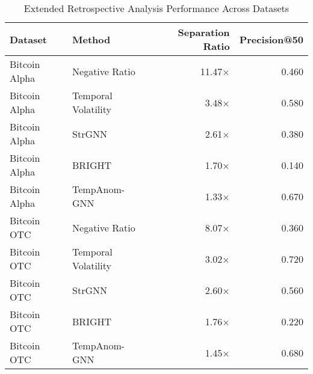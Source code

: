 
\begin{table*}[ht]
\centering
\caption{Extended Retrospective Analysis Performance Across Datasets}
\label{tab:retrospective_extended}
\begin{tabular}{llrr}
\toprule
Dataset & Method & Separation Ratio & Precision@50 \\
\midrule
Bitcoin Alpha & Negative Ratio & 11.47× & 0.460 \\
Bitcoin Alpha & Temporal Volatility & 3.48× & 0.580 \\
Bitcoin Alpha & StrGNN & 2.61× & 0.380 \\
Bitcoin Alpha & BRIGHT & 1.70× & 0.140 \\
Bitcoin Alpha & TempAnom-GNN & 1.33× & 0.670 \\
\midrule
Bitcoin OTC & Negative Ratio & 8.07× & 0.360 \\
Bitcoin OTC & Temporal Volatility & 3.02× & 0.720 \\
Bitcoin OTC & StrGNN & 2.60× & 0.560 \\
Bitcoin OTC & BRIGHT & 1.76× & 0.220 \\
Bitcoin OTC & TempAnom-GNN & 1.45× & 0.680 \\
\bottomrule
\end{tabular}
\end{table*}
